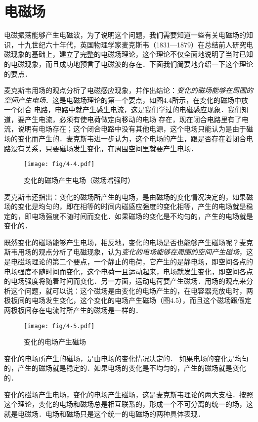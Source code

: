 \section{电磁场}

电磁振荡能够产生电磁波，为了说明这个问题，我们需要知道一些有关电磁场的知识，十九世纪六十年代，英国物理学家麦克斯韦（1831—1879）在总结前人研究电磁现象的基础上，建立了完整的电磁场理论，这个理论不仅全面地说明了当时已知的电磁现象，而且成功地预言了电磁波的存在．下面我们简要地介绍一下这个理论的要点．

麦克斯韦用场的观点分析了电磁感应现象，并作出结论：\textit{变化的磁场能够在周围的空间产生电场}．这是电磁场理论的第一个要点，如图4.4所示，在变化的磁场中放一个闭合
电路，电路中就产生感生电流，这是我们学过的电磁感应现象．我们知道，要产生电流，必须有使电荷做定向移动的电场
存在，现在闭合电路里有了电流，说明有电场存在；这个闭合电路中没有其他电源，这个电场只能认为是由于磁场的变化而产生的．麦克斯韦进一步认为，这个电场的产生，跟是否存在着闭合电路没有关系，只要磁场发生变化，在周围空间里就要产生电场．
\begin{figure}[htp]\centering
\texttt{[image: fig/4-4.pdf]}
\caption{变化的磁场产生电场（磁场增强时）}
\end{figure}

麦克斯韦还指出：变化的磁场所产生的电场，是由磁场的变化情况决定的，如果磁场的变化是均匀的，即在相等的时间内磁感应强度的变化相等，产生的电场就是稳定的，即电场强度不随时间而变化．如果磁场的变化是不均匀的，产生的电场就是变化的．

既然变化的磁场能够产生电场，相反地，变化的电场是否也能够产生磁场呢？麦克斯韦用场的观点分析了电磁现象，认为\textit{变化的电场能够在周围的空间产生磁场}，这是电磁场理论的第二个要点，一个静止的电荷，它产生的是静电场，即空间各点的电场强度不随时间而变化，这个电荷一且运动起来，电场就发生变化，即空间各点的电场强度将随着时间而变化．另一方面，运动电荷要产生磁场．用场的观点来分析这个问题，就可以说：这个磁场是由变化的电场产生的，在电容器充放电时，两极板间的电场发生变化，这个变化的电场产生磁场（图4.5），而且这个磁场跟假定两极板间存在电流时所产生的磁场是一样的．
\begin{figure}[htp]\centering
\texttt{[image: fig/4-5.pdf]}
\caption{变化的电场产生磁场}
\end{figure}


变化的电场所产生的磁场，是由电场的变化情况决定的．
如果电场的变化是均匀的，产生的磁场就是稳定的．如果电场的变化是不均匀的，产生的磁场就是变化的．

变化的磁场产生电场，变化的电场产生磁场，这是麦克斯韦理论的两大支柱．按照这个理论，变化的电场和磁场总是相互联系的，形成一个不可分离的统一的场，这就是电磁场．电场和磁场只是这个统一的电磁场的两种具体表现．


